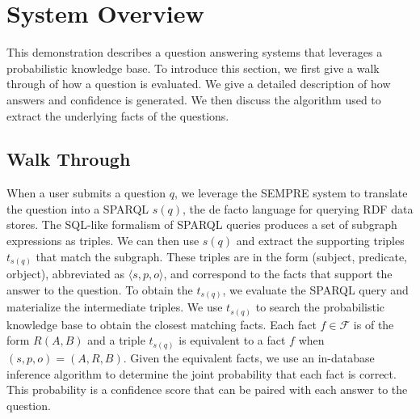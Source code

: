 
\section{System Overview}

This demonstration describes a question answering systems that leverages a probabilistic knowledge base.
To introduce this section, we first give a walk through of how a question is evaluated.
We give a detailed description of how answers and confidence is generated.
We then discuss the algorithm used to extract the underlying facts of the questions.




\subsection{Walk Through}
\label{sec:probqa-walkthrough}
When a user submits a question \(q\), we leverage the SEMPRE system to translate
the question into a SPARQL $s(q)$, the de facto language for querying RDF data stores.
The  SQL-like formalism of SPARQL queries produces a set of subgraph expressions as triples.
We can then use $s(q)$ and extract the supporting triples \(t_{s(q)}\) that
match the subgraph.
These triples are in the form (subject, predicate, orbject), abbreviated as
\(\langle s, p, o \rangle\), and correspond to the facts that support the answer to the question.
To obtain the \(t_{s(q)}\), we evaluate the SPARQL query and materialize the
intermediate triples.
We use \(t_{s(q)}\) to search the probabilistic knowledge base to obtain the closest matching facts.
Each fact \(f \in \mathcal{F}\) is of the form \(R(A,B)\) and a triple \(t_{s(q)}\) is equivalent to a fact \(f\) when 
\( (s,p,o) = (A,R,B) \).
Given the equivalent facts, we use an in-database inference algorithm to determine the joint probability that each fact is correct.
This probability is a confidence score that can be paired with each answer to the question.



